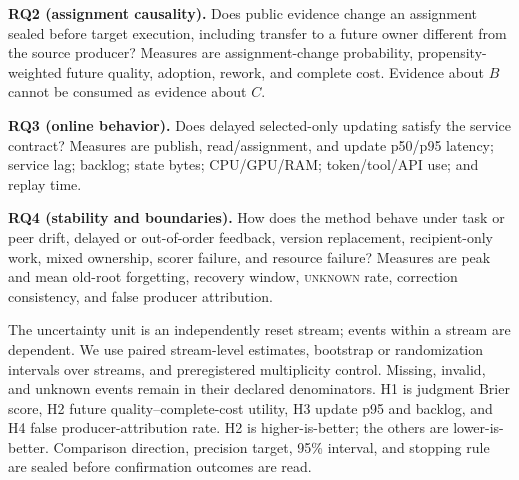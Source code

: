 \documentclass[sigconf,anonymous]{aamas}
\newcommand{\unknown}{\textsc{unknown}}
\begin{document}
\textbf{RQ2 (assignment causality).} Does public evidence change an assignment sealed before target execution, including transfer to a future owner different from the source producer? Measures are assignment-change probability, propensity-weighted future quality, adoption, rework, and complete cost. Evidence about $B$ cannot be consumed as evidence about $C$.

\textbf{RQ3 (online behavior).} Does delayed selected-only updating satisfy the service contract? Measures are publish, read/assignment, and update p50/p95 latency; service lag; backlog; state bytes; CPU/GPU/RAM; token/tool/API use; and replay time.

\textbf{RQ4 (stability and boundaries).} How does the method behave under task or peer drift, delayed or out-of-order feedback, version replacement, recipient-only work, mixed ownership, scorer failure, and resource failure? Measures are peak and mean old-root forgetting, recovery window, \unknown{} rate, correction consistency, and false producer attribution.

The uncertainty unit is an independently reset stream; events within a stream are dependent. We use paired stream-level estimates, bootstrap or randomization intervals over streams, and preregistered multiplicity control. Missing, invalid, and unknown events remain in their declared denominators. H1 is judgment Brier score, H2 future quality--complete-cost utility, H3 update p95 and backlog, and H4 false producer-attribution rate. H2 is higher-is-better; the others are lower-is-better. Comparison direction, precision target, 95\% interval, and stopping rule are sealed before confirmation outcomes are read.
\end{document}
